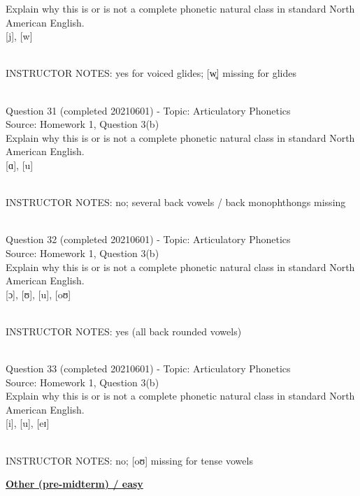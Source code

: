 \documentclass[12pt]{article}
\begin{document}
Explain why this is or is not a complete phonetic natural class in standard North American English.\\

{[j]}, {[w]}


~\\
INSTRUCTOR NOTES: yes for voiced glides; [w̥] missing for glides


~\\

{\large Question 31} (completed 20210601) - Topic: Articulatory Phonetics\\
Source: Homework 1, Question 3(b)\\

Explain why this is or is not a complete phonetic natural class in standard North American English.\\

{[ɑ]}, {[u]}


~\\
INSTRUCTOR NOTES: no; several back vowels / back monophthongs missing


~\\

{\large Question 32} (completed 20210601) - Topic: Articulatory Phonetics\\
Source: Homework 1, Question 3(b)\\

Explain why this is or is not a complete phonetic natural class in standard North American English.\\

{[ɔ]}, {[ʊ]}, {[u]}, {[oʊ]}


~\\
INSTRUCTOR NOTES: yes (all back rounded vowels)


~\\

{\large Question 33} (completed 20210601) - Topic: Articulatory Phonetics\\
Source: Homework 1, Question 3(b)\\

Explain why this is or is not a complete phonetic natural class in standard North American English.\\

{[i]}, {[u]}, {[eɪ]}


~\\
INSTRUCTOR NOTES: no; [oʊ] missing for tense vowels


\newpage\textbf{\underline{\huge Other (pre-midterm) / easy\\}}
\end{document}
